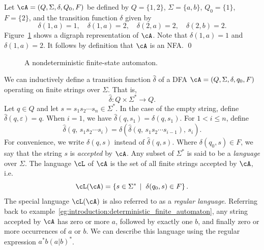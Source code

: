 \begin{example}
\rm
Let $\cA = (Q, \Sigma, \delta, Q_0, F)$ be defined by
$Q = \{1, 2\}$, $\Sigma = \{a, b\}$, $Q_0 = \{1\}$,
$F = \{2\}$, and the transition function $\delta$ given by
\[
\delta(1,a) = 1,\quad
\delta(1,a) = 2,\quad
\delta(2,a) = 2,\quad
\delta(2,b) = 2.
\]
Figure~\ref{fig:introduction:nondeterministic_finite_state_automaton}
shows a digraph representation of $\cA$. Note that $\delta(1,a) = 1$
and $\delta(1,a) = 2$. It follows by definition that $\cA$ is an
NFA. \qed
\end{example}

\begin{figure}[!htbp]
\centering
{}

\caption{A nondeterministic finite-state automaton.}
\label{fig:introduction:nondeterministic_finite_state_automaton}
\end{figure}

We can inductively define a transition function $\hat{\delta}$ of a
DFA $\cA = (Q, \Sigma, \delta, q_0, F)$ operating on finite strings
over $\Sigma$. That is,
\begin{equation}
\hat{\delta} : Q \times \Sigma^\ast \to Q.
\end{equation}
Let $q \in Q$ and let $s = s_1 s_2 \cdots s_n \in \Sigma^\ast$. In the
case of the empty string, define
$\hat{\delta} (q, \varepsilon) = q$. When $i = 1$, we have
$\hat{\delta}(q, s_1) = \delta(q, s_1)$. For $1 < i \leq n$, define
\[
\hat{\delta}(q,\, s_1 s_2 \cdots s_i)
=
\hat{\delta}
\left(
  \hat{\delta}(q,\, s_1 s_2 \cdots s_{i-1}),\, s_i
\right).
\]
For convenience, we write $\delta(q,s)$ instead of
$\hat{\delta}(q,s)$. Where $\delta(q_0,s) \in F$, we say that the
string $s$ is \emph{accepted} by $\cA$. Any
subset of $\Sigma^\ast$ is said to be a
\emph{language} over $\Sigma$. The language
$\cL$\index{$\cL$} of $\cA$ is the set of all finite strings accepted
by $\cA$, i.e.
\[
\cL(\cA)
=
\left\{
  s \in \Sigma^\ast \;\left|\right.\; \delta(q_0,s) \in F
\right\}.
\]
The special language $\cL(\cA)$ is also referred to as a
\emph{regular language}. Referring back to
example~\ref{eg:introduction:deterministic_finite_automaton}, any
string accepted by $\cA$ has zero or more $a$, followed by exactly
one $b$, and finally zero or more occurrences of $a$ or $b$. We can
describe this language using the regular
expression $a^\ast b (a|b)^\ast$.

